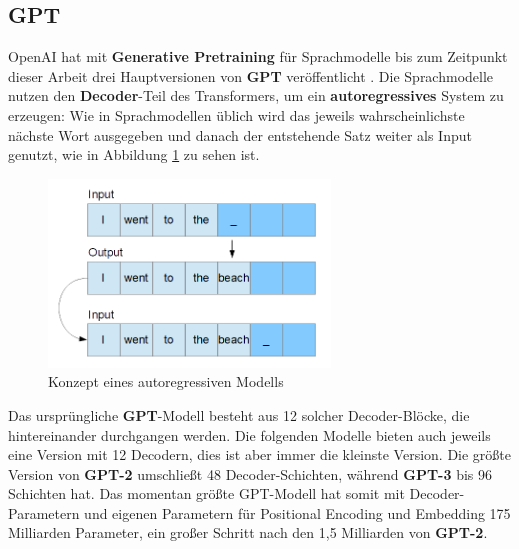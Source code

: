 \subsection{GPT}
OpenAI hat mit \textbf{Generative Pretraining} f\"ur Sprachmodelle bis zum Zeitpunkt dieser Arbeit drei Hauptversionen von \textbf{GPT} ver\"offentlicht \cite{gpt}\cite{gpt2}\cite{gpt3}. Die Sprachmodelle nutzen den \textbf{Decoder}-Teil des Transformers, um ein \textbf{autoregressives} System zu erzeugen: Wie in Sprachmodellen \"ublich wird das jeweils wahrscheinlichste n\"achste Wort ausgegeben und danach der entstehende Satz weiter als Input genutzt, wie in Abbildung \ref{fig:autoregressive} zu sehen ist.\\
\begin{figure}[!ht]
\centering
\includegraphics[height=5cm]{pics/autoregressives_modell.png}
\caption{Konzept eines autoregressiven Modells}
\label{fig:autoregressive}
\end{figure}
Das urspr\"ungliche \textbf{GPT}-Modell besteht aus 12 solcher Decoder-Bl\"ocke, die hintereinander durchgangen werden. Die folgenden Modelle bieten auch jeweils eine Version mit 12 Decodern, dies ist aber immer die kleinste Version. Die gr\"o{\ss}te Version von \textbf{GPT-2 } umschlie{\ss}t 48 Decoder-Schichten, w\"ahrend \textbf{GPT-3} bis 96 Schichten hat. Das momentan gr\"o{\ss}te GPT-Modell hat somit mit Decoder-Parametern und eigenen Parametern f\"ur Positional Encoding und Embedding 175 Milliarden Parameter, ein gro{\ss}er Schritt nach den 1,5 Milliarden von \textbf{GPT-2}.\\
